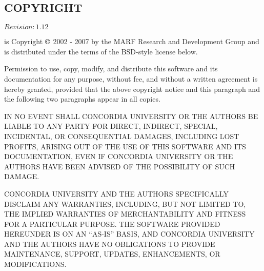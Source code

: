 \subsection{COPYRIGHT}

$Revision: 1.12 $

{\marf} is Copyright $\copyright$ 2002 - 2007
by the MARF Research and Development Group and is distributed under
the terms of the BSD-style license below.

\vspace{15pt}
\noindent
Permission to use, copy, modify, and distribute this software and
its documentation for any purpose, without fee, and without a
written agreement is hereby granted, provided that the above
copyright notice and this paragraph and the following two paragraphs
appear in all copies.

\vspace{15pt}
\noindent
IN NO EVENT SHALL CONCORDIA UNIVERSITY OR THE AUTHORS BE LIABLE TO ANY
PARTY FOR DIRECT, INDIRECT, SPECIAL, INCIDENTAL, OR CONSEQUENTIAL
DAMAGES, INCLUDING LOST PROFITS, ARISING OUT OF THE USE OF THIS
SOFTWARE AND ITS DOCUMENTATION, EVEN IF CONCORDIA UNIVERSITY OR THE AUTHORS
HAVE BEEN ADVISED OF THE POSSIBILITY OF SUCH DAMAGE.

\vspace{15pt}
\noindent
CONCORDIA UNIVERSITY AND THE AUTHORS SPECIFICALLY DISCLAIM ANY WARRANTIES,
INCLUDING, BUT NOT LIMITED TO, THE IMPLIED WARRANTIES OF
MERCHANTABILITY AND FITNESS FOR A PARTICULAR PURPOSE.  THE SOFTWARE
PROVIDED HEREUNDER IS ON AN ``AS-IS'' BASIS, AND CONCORDIA UNIVERSITY AND THE
AUTHORS HAVE NO OBLIGATIONS TO PROVIDE MAINTENANCE, SUPPORT,
UPDATES, ENHANCEMENTS, OR MODIFICATIONS.
